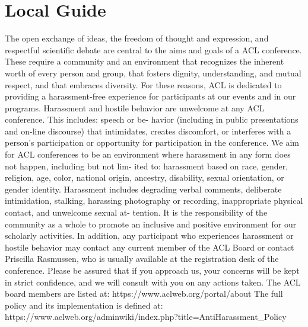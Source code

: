 \chapter{Local Guide}
\vspace*{0.2cm}

The open exchange of ideas, the freedom of thought and expression, and respectful scientific debate are central to the aims and goals of a ACL conference. These require a community and an environment that recognizes the inherent worth of every person and group, that fosters dignity, understanding, and mutual respect, and that embraces diversity. For these reasons, ACL is dedicated to providing a harassment-free experience for participants at our events and in our programs.
Harassment and hostile behavior are unwelcome at any ACL conference. This includes: speech or be- havior (including in public presentations and on-line discourse) that intimidates, creates discomfort, or interferes with a person’s participation or opportunity for participation in the conference. We aim for ACL conferences to be an environment where harassment in any form does not happen, including but not lim- ited to: harassment based on race, gender, religion, age, color, national origin, ancestry, disability, sexual orientation, or gender identity. Harassment includes degrading verbal comments, deliberate intimidation, stalking, harassing photography or recording, inappropriate physical contact, and unwelcome sexual at- tention.
It is the responsibility of the community as a whole to promote an inclusive and positive environment for our scholarly activities. In addition, any participant who experiences harassment or hostile behavior may contact any current member of the ACL Board or contact Priscilla Rasmussen, who is usually available at the registration desk of the conference. Please be assured that if you approach us, your concerns will be kept in strict confidence, and we will consult with you on any actions taken.
The ACL board members are listed at:
https://www.aclweb.org/portal/about
The full policy and its implementation is defined at:
https://www.aclweb.org/adminwiki/index.php?title=Anti\-Harassment\_Policy